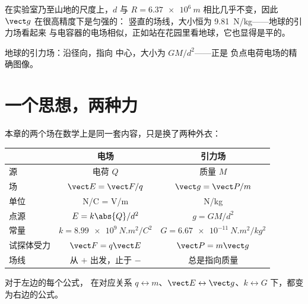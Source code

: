 \begin{remark}[近地表的匀强性]\label{rem:g11:electric-gravitational-fields:uniformg}
在实验室乃至山地的尺度上，$d$ 与
$R = \qty{6.37e6}{m}$ 相比几乎不变，因此 $\vect g$ 在很高精度下是匀强的：
竖直的场线，大小恒为 \qty{9.81}{N/kg}——地球的引力场看起来
与电容器的电场相似，正如站在花园里看地球，它也显得是平的。
\end{remark}

\begin{omfigure}

{\small 地球的引力场：沿径向，指向
中心，大小为 $GM/d^2$——正是
负点电荷电场的精确图像。}
\end{omfigure}

\section{一个思想，两种力}

本章的两个场在数学上是同一套内容，只是换了两种外衣：

\begin{center}
\begin{tabular}{lcc}
 & \textbf{电场} & \textbf{引力场} \\
\hline
源 & 电荷 $Q$ & 质量 $M$ \\
场 & $\vect E = \vect F / q$ & $\vect g = \vect P / m$ \\
单位 & \unit{N/C} = \unit{V/m} & \unit{N/kg} \\
点源 & $E = k \abs{Q} / d^2$ & $g = G M / d^2$ \\
常量 & $k = \qty{8.99e9}{N.m^2/C^2}$ & $G = \qty{6.67e-11}{N.m^2/kg^2}$ \\
试探体受力 & $\vect F = q \vect E$ & $\vect P = m \vect g$ \\
场线 & 从 $+$ 出发，止于 $-$ & 总是指向质量 \\
\end{tabular}
\end{center}

对于左边的每个公式，
在对应关系 $q \leftrightarrow m$、$\vect E \leftrightarrow \vect g$、$k \leftrightarrow G$ 下，都变为右边的公式。

